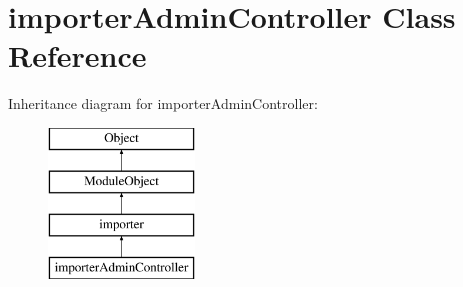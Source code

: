 \hypertarget{classimporterAdminController}{\section{importer\+Admin\+Controller Class Reference}
\label{classimporterAdminController}
}
Inheritance diagram for importer\+Admin\+Controller\+:\begin{figure}[H]
\begin{center}
\leavevmode
\includegraphics[height=4.000000cm]{classimporterAdminController}
\end{center}
\end{figure}
